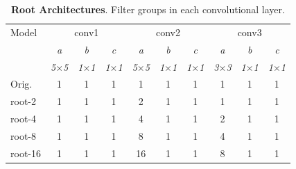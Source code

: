 \documentclass[thesis]{subfiles}
\begin{document}
	\begin{table}[tbp]
		\caption[ root architectures]{\textbf{ Root Architectures}. Filter groups in each convolutional layer.}
		\label{table:ninconfig}
		\centering
		\begin{tabular}{@{}lccccccccc@{}}
			\toprule
			Model & \multicolumn{3}{c}{conv1} & \multicolumn{3}{c}{conv2} & \multicolumn{3}{c}{conv3} \\
			& \textit{\footnotesize a} & \textit{\footnotesize b} & \textit{\footnotesize c} & \textit{\footnotesize a} & \textit{\footnotesize b} & \textit{\footnotesize c} & \textit{\footnotesize a} & \textit{\footnotesize b} & \textit{\footnotesize c} \\
			& \textit{\footnotesize5$\times$5} & \textit{\footnotesize1$\times$1} & \textit{\footnotesize1$\times$1} & \textit{\footnotesize5$\times$5} & \textit{\footnotesize1$\times$1} & \textit{\footnotesize1$\times$1} & \textit{\footnotesize3$\times$3} & \textit{\footnotesize1$\times$1} & \textit{\footnotesize1$\times$1} \\
			Orig. & 1 & 1 & 1 & 1 & 1 & 1 & 1 & 1 & 1\\
			\midrule
			root-2 & 1 & 1 & 1 & 2 & 1 & 1 & 1 & 1 & 1\\
			root-4 & 1 & 1 & 1 & 4 & 1 & 1 & 2 & 1 & 1\\
			root-8 & 1 & 1 & 1 & 8 & 1 & 1 & 4 & 1 & 1\\
			root-16 & 1 & 1 & 1 & 16 & 1 & 1 & 8 & 1 & 1\\
			\bottomrule
		\end{tabular}
	\end{table}
\end{document}
